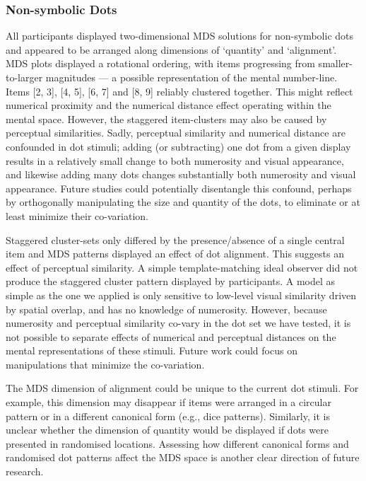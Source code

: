 \subsubsection{Non-symbolic Dots}
All participants displayed two-dimensional MDS solutions for non-symbolic dots and appeared to be arranged along dimensions of `quantity’ and `alignment’. MDS plots displayed a rotational ordering, with items progressing from smaller-to-larger magnitudes --- a possible representation of the mental number-line. Items [2, 3], [4, 5], [6, 7] and [8, 9] reliably clustered together. This might reflect numerical proximity and the numerical distance effect operating within the mental space. However, the staggered item-clusters may also be caused by perceptual similarities. Sadly, perceptual similarity and numerical distance are confounded in dot stimuli; adding (or subtracting) one dot from a given display results in a relatively small change to both numerosity and visual appearance, and likewise adding many dots changes substantially both numerosity and visual appearance. Future studies could potentially disentangle this confound, perhaps by orthogonally manipulating the size and quantity of the dots, to eliminate or at least minimize their co-variation. 

Staggered cluster-sets only differed by the presence/absence of a single central item and MDS patterns displayed an effect of dot alignment. This suggests an effect of perceptual similarity. A simple template-matching ideal observer did not produce the staggered cluster pattern displayed by participants. A model as simple as the one we applied is only sensitive to low-level visual similarity driven by spatial overlap, and has no knowledge of numerosity. However, because numerosity and perceptual similarity co-vary in the dot set we have tested, it is not possible to separate effects of numerical and perceptual distances on the mental representations of these stimuli. Future work could focus on manipulations that minimize the co-variation. 

The MDS dimension of alignment could be unique to the current dot stimuli. For example, this dimension may disappear if items were arranged in a circular pattern or in a different canonical form (e.g., dice patterns). Similarly, it is unclear whether the dimension of quantity would be displayed if dots were presented in randomised locations. Assessing how different canonical forms and randomised dot patterns affect the MDS space is another clear direction of future research.

